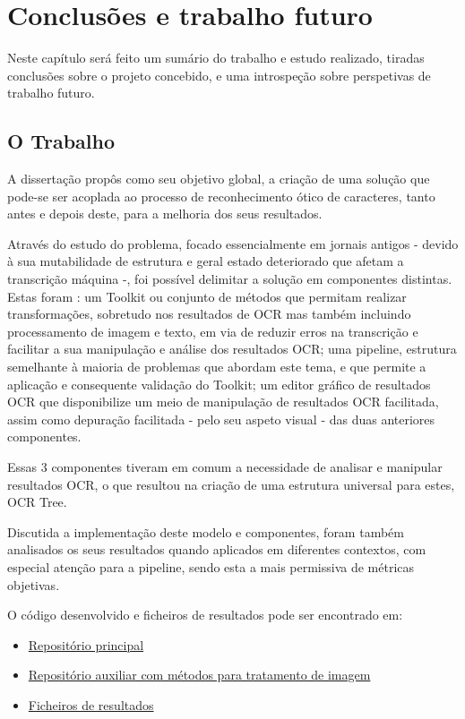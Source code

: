 \chapter{Conclusões e trabalho futuro}
\label{cap_conclusao}

Neste capítulo será feito um sumário do trabalho e estudo realizado, tiradas conclusões sobre o projeto concebido, e uma introspeção sobre perspetivas de trabalho futuro.

\section{O Trabalho}

A dissertação propôs como seu objetivo global, a criação de uma solução que pode-se ser acoplada ao processo de reconhecimento ótico de caracteres, tanto antes e depois deste, para a melhoria dos seus resultados. 

Através do estudo do problema, focado essencialmente em jornais antigos - devido à sua mutabilidade de estrutura e geral estado deteriorado que afetam a transcrição máquina -, foi possível delimitar a solução em componentes distintas. Estas foram : um Toolkit ou conjunto de métodos que permitam realizar transformações, sobretudo nos resultados de OCR mas também incluindo processamento de imagem e texto, em via de reduzir erros na transcrição e facilitar a sua manipulação e análise dos resultados OCR; uma pipeline, estrutura semelhante à maioria de problemas que abordam este tema, e que permite a aplicação e consequente validação do Toolkit; um editor gráfico de resultados OCR que disponibilize um meio de manipulação de resultados OCR facilitada, assim como depuração facilitada - pelo seu aspeto visual - das duas anteriores componentes.

Essas 3 componentes tiveram em comum a necessidade de analisar e manipular resultados OCR, o que resultou na criação de uma estrutura universal para estes, OCR Tree.

Discutida a implementação deste modelo e componentes, foram também analisados os seus resultados quando aplicados em diferentes contextos, com especial atenção para a pipeline, sendo esta a mais permissiva de métricas objetivas.

O código desenvolvido e ficheiros de resultados pode ser encontrado em:
\begin{itemize}
	\item \href{https://github.com/brazafonso/OCR-old_documents}{Repositório principal}
	\item \href{https://github.com/brazafonso/document_image_processing}{Repositório auxiliar com métodos para tratamento de imagem}
	\item \href{https://drive.google.com/drive/u/0/folders/1DW-AIuSxjEyv6ioq7jX8P1xruy03Sxo9}{Ficheiros de resultados}
\end{itemize}



